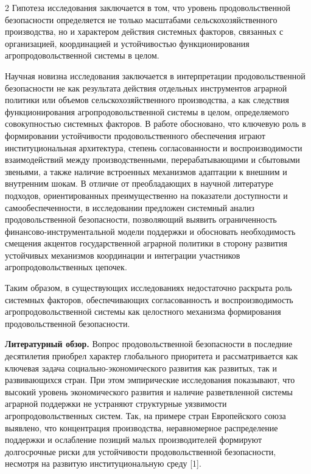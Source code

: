 \begin{multicols}{2}
Гипотеза исследования заключается в том, что уровень продовольственной
безопасности определяется не только масштабами сельскохозяйственного
производства, но и характером действия системных факторов, связанных с
организацией, координацией и устойчивостью функционирования
агропродовольственной системы в целом.

Научная новизна исследования заключается в интерпретации
продовольственной безопасности не как результата действия отдельных
инструментов аграрной политики или объемов сельскохозяйственного
производства, а как следствия функционирования агропродовольственной
системы в целом, определяемого совокупностью системных факторов. В
работе обосновано, что ключевую роль в формировании устойчивости
продовольственного обеспечения играют институциональная архитектура,
степень согласованности и воспроизводимости взаимодействий между
производственными, перерабатывающими и сбытовыми звеньями, а также
наличие встроенных механизмов адаптации к внешним и внутренним шокам. В
отличие от преобладающих в научной литературе подходов, ориентированных
преимущественно на показатели доступности и самообеспеченности, в
исследовании предложен системный анализ продовольственной безопасности,
позволяющий выявить ограниченность финансово-инструментальной модели
поддержки и обосновать необходимость смещения акцентов государственной
аграрной политики в сторону развития устойчивых механизмов координации и
интеграции участников агропродовольственных цепочек.

Таким образом, в существующих исследованиях недостаточно раскрыта роль
системных факторов, обеспечивающих согласованность и воспроизводимость
агропродовольственной системы как целостного механизма формирования
продовольственной безопасности.

{\bfseries Литературный обзор.} Вопрос продовольственной безопасности в
последние десятилетия приобрел характер глобального приоритета и
рассматривается как ключевая задача социально-экономического развития
как развитых, так и развивающихся стран. При этом эмпирические
исследования показывают, что высокий уровень экономического развития и
наличие разветвленной системы аграрной поддержки не устраняют
структурные уязвимости агропродовольственных систем. Так, на примере
стран Европейского союза выявлено, что концентрация производства,
неравномерное распределение поддержки и ослабление позиций малых
производителей формируют долгосрочные риски для устойчивости
продовольственной безопасности, несмотря на развитую институциональную
среду {[}1{]}.


\end{multicols}
